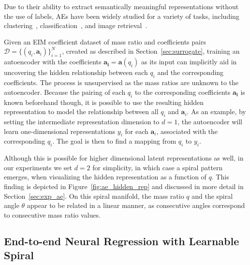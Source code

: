 \documentclass[preprint,12pt]{elsarticle}
\begin{document}
Due to their ability to extract semantically meaningful representations without the use of labels, AEs have been widely studied for a variety of tasks, including clustering~\cite{xie2016unsupervised,nousi2018self}, classification~\cite{nousi2017deep,nousi2017discriminatively}, and image retrieval~\cite{wu2013online,carreira2015hashing}. 

Given an EIM coefficient dataset of mass ratio and coefficients pairs $\mathcal{D}=\{ (q_i, \mathbf{a}_i) \}_{i=1}^{N}$, created as described in Section~\ref{sec:surrogate}, training an autoencoder with the coefficients $\mathbf{a_i}=\mathbf{a}(q_i)$ as its input can implicitly aid in uncovering the hidden relationship between each $q_i$ and the corresponding coefficients. The process is unsupervised as the mass ratios are unknown to the autoencoder. Because the pairing of each $q_i$ to the corresponding coefficients 
$\mathbf{a_i}$ is known beforehand though, it is possible to use the resulting hidden representation to model the relationship between all $q_i$ and $\mathbf{a}_i$. As an example, by setting the intermediate representation dimension to $d=1$, the autoencoder will learn one-dimensional representations $y_i$ for each $\mathbf{a}_i$, associated with the corresponding $q_i$. The goal is then to find a mapping from $q_i$ to $y_i$.

Although this is possible for higher dimensional latent representations as well, in our experiments we set $d=2$ for simplicity, in which case a spiral pattern emerges, when visualizing the hidden representation as a function of $q$. This finding is depicted in Figure~\ref{fig:ae_hidden_rep} and discussed in more detail in Section~\ref{sec:exp_ae}. On this spiral manifold, the mass ratio $q$ and the spiral angle $\theta$ appear to be related in a linear manner, as consecutive angles correspond to consecutive mass ratio values. 


\subsection{End-to-end Neural Regression with Learnable Spiral}
\end{document}
